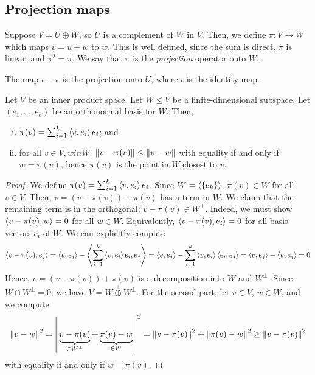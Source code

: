 \subsection{Projection maps}
\begin{definition}
	Suppose \( V = U \oplus W \), so \( U \) is a complement of \( W \) in \( V \).
	Then, we define \( \pi \colon V \to W \) which maps \( v = u + w \) to \( w \).
	This is well defined, since the sum is direct.
	\( \pi \) is linear, and \( \pi^2 = \pi \).
	We say that \( \pi \) is the \textit{projection} operator onto \( W \).
\end{definition}
\begin{remark}
	The map \( \iota - \pi \) is the projection onto \( U \), where \( \iota \) is the identity map.
\end{remark}
\begin{lemma}
	Let \( V \) be an inner product space.
	Let \( W \leq V \) be a finite-dimensional subspace.
	Let \( (e_1, \dots, e_k) \) be an orthonormal basis for \( W \).
	Then,
	\begin{enumerate}[(i)]
		\item \( \pi(v) = \sum_{i=1}^k \left\langle{v, e_i}\right\rangle e_i \); and
		\item for all \( v \in V, w in W \), \( \norm{v - \pi(v)} \leq \norm{v - w} \) with equality if and only if \( w = \pi(v) \), hence \( \pi(v) \) is the point in \( W \) closest to \( v \).
	\end{enumerate}
\end{lemma}
\begin{proof}
	We define \( \pi(v) = \sum_{i=1}^k \left\langle{v, e_i}\right\rangle e_i \).
	Since \( W = \langle{} \qty{e_k} \rangle \), \( \pi(v) \in W \) for all \( v \in V \).
	Then, \( v = (v - \pi(v)) + \pi(v) \) has a term in \( W \).
	We claim that the remaining term is in the orthogonal; \( v - \pi(v) \in W^\perp \).
	Indeed, we must show \( \left\langle{v - \pi(v), w}\right\rangle = 0 \) for all \( w \in W \).
	Equivalently, \( \left\langle{v - \pi(v), e_i}\right\rangle = 0 \) for all basis vectors \( e_i \) of \( W \).
	We can explicitly compute
	\[
		\left\langle{v - \pi(v), e_j}\right\rangle = \left\langle{v, e_j}\right\rangle - \left\langle{\sum_{i=1}^k \left\langle{v, e_i}\right\rangle e_i, e_j}\right\rangle = \left\langle{v, e_j}\right\rangle - \sum_{i=1}^k \left\langle{v, e_i}\right\rangle \left\langle{e_i, e_j}\right\rangle = \left\langle{v, e_j}\right\rangle - \left\langle{v, e_j}\right\rangle = 0
	\]
	Hence, \( v = (v - \pi(v)) + \pi(v) \) is a decomposition into \( W \) and \( W^\perp \).
	Since \( W \cap W^\perp = \qty{0} \), we have \( V = W \overset{\perp}{\oplus} W^\perp \).
	For the second part, let \( v \in V \), \( w \in W \), and we compute
	\[
		\norm{v - w}^2 = \norm{\underbrace{v - \pi(v)}_{\in W^\perp} + \underbrace{\pi(v) - w}_{\in W}}^2 = \norm{v - \pi(v)}^2 + \norm{\pi(v) - w}^2 \geq \norm{v - \pi(v)}^2
	\]
	with equality if and only if \( w = \pi(v) \).
\end{proof}

